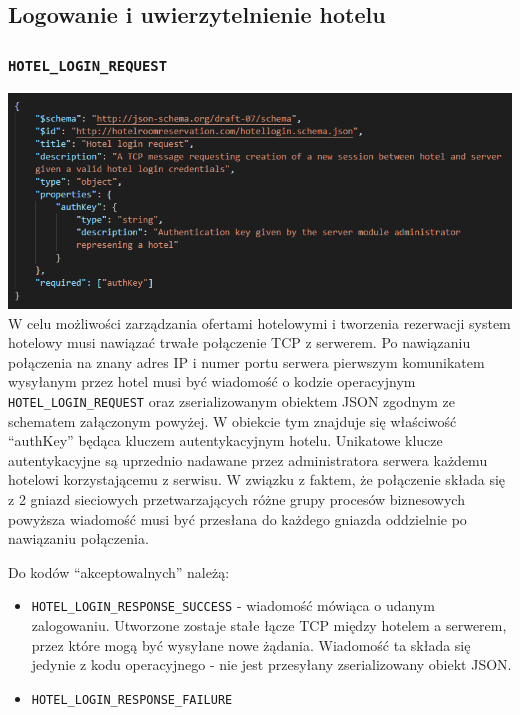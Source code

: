 \documentclass{article}
\begin{document}
\subsection{Logowanie i uwierzytelnienie hotelu}

\subsubsection{\texttt{HOTEL\_LOGIN\_REQUEST}}
\includegraphics[width=\linewidth]{Hotel login + synchronizacja/hotel_login_request.png}
\indent W celu możliwości zarządzania ofertami hotelowymi i tworzenia rezerwacji system hotelowy musi nawiązać trwałe połączenie TCP z serwerem. Po nawiązaniu połączenia na znany adres IP i numer portu serwera pierwszym komunikatem wysyłanym przez hotel musi być wiadomość o kodzie operacyjnym \texttt{HOTEL\_LOGIN\_REQUEST} oraz zserializowanym obiektem JSON zgodnym ze schematem załączonym powyżej. W obiekcie tym znajduje się właściwość “authKey” będąca kluczem autentykacyjnym hotelu. Unikatowe klucze autentykacyjne są uprzednio nadawane przez administratora serwera każdemu hotelowi korzystającemu z serwisu. W związku z faktem, że połączenie składa się z 2 gniazd sieciowych przetwarzających różne grupy procesów biznesowych powyższa wiadomość musi być przesłana do każdego gniazda oddzielnie po nawiązaniu połączenia.

Do kodów “akceptowalnych” należą:
\begin{itemize}
    \item \texttt{HOTEL\_LOGIN\_RESPONSE\_SUCCESS} - wiadomość mówiąca o udanym zalogowaniu. Utworzone zostaje stałe łącze TCP między hotelem a serwerem, przez które mogą być wysyłane nowe żądania. Wiadomość ta składa się jedynie z kodu operacyjnego - nie jest przesyłany zserializowany obiekt JSON.
    \item \texttt{HOTEL\_LOGIN\_RESPONSE\_FAILURE}
\end{itemize}
\end{document}

